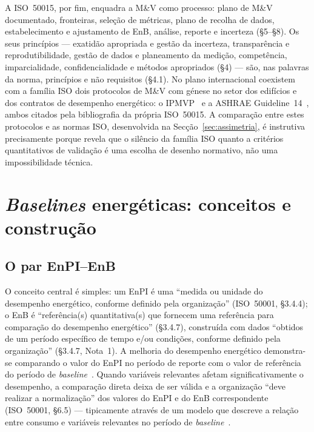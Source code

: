 A ISO~50015, por fim, enquadra a M\&V como processo: plano de M\&V documentado, fronteiras, seleção de métricas, plano de recolha de dados, estabelecimento e ajustamento de EnB, análise, reporte e incerteza (\S5--\S8). Os seus princípios --- exatidão apropriada e gestão da incerteza, transparência e reprodutibilidade, gestão de dados e planeamento da medição, competência, imparcialidade, confidencialidade e métodos apropriados (\S4) --- são, nas palavras da norma, princípios e não requisitos (\S4.1). No plano internacional coexistem com a família ISO dois protocolos de M\&V com génese no setor dos edifícios e dos contratos de desempenho energético: o IPMVP~\cite{IPMVP_2022} e a ASHRAE Guideline~14~\cite{ASHRAE14_2014}, ambos citados pela bibliografia da própria ISO~50015. A comparação entre estes protocolos e as normas ISO, desenvolvida na Secção~\ref{sec:assimetria}, é instrutiva precisamente porque revela que o silêncio da família ISO quanto a critérios quantitativos de validação é uma escolha de desenho normativo, não uma impossibilidade técnica.

\section{\emph{Baselines} energéticas: conceitos e construção}
\label{sec:enb}

\subsection{O par EnPI--EnB}
\label{sec:enb-par}

O conceito central é simples: um EnPI é uma \enquote{medida ou unidade do desempenho energético, conforme definido pela organização} (ISO~50001, \S3.4.4); o EnB é \enquote{referência(s) quantitativa(s) que fornecem uma referência para comparação do desempenho energético} (\S3.4.7), construída com dados \enquote{obtidos de um período específico de tempo e/ou condições, conforme definido pela organização} (\S3.4.7, Nota~1). A melhoria do desempenho energético demonstra-se comparando o valor do EnPI no período de reporte com o valor de referência do período de \emph{baseline}~\cite[Figuras~1 e~3]{ISO50006_2014}. Quando variáveis relevantes afetam significativamente o desempenho, a comparação direta deixa de ser válida e a organização \enquote{deve realizar a normalização} dos valores do EnPI e do EnB correspondente (ISO~50001, \S6.5) --- tipicamente através de um modelo que descreve a relação entre consumo e variáveis relevantes no período de \emph{baseline}~\cite[\S4.5.1 e Anexo~D]{ISO50006_2014}.

